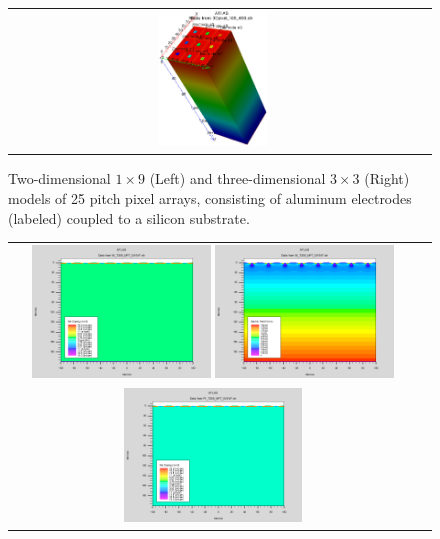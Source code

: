 \begin{refsection}
\begin{figure}[htb]
\begin{center}
\begin{tabular}{cc}
      \includegraphics[width=0.275\textwidth]{fig_FastTiming/Model3D.png}
    \end{tabular}
    \caption{Two-dimensional $1 \times 9$ (Left) and three-dimensional $3 \times 3$ (Right) models of \SI{25}{\micron} pitch pixel arrays, consisting of aluminum electrodes (labeled) coupled to a silicon substrate.
            }
    \label{Materials_Model}
  \end{center}
\end{figure}
\begin{figure}[htb]
  \begin{center}
    \begin{tabular}{cc}
      \includegraphics[width=0.45\textwidth]{fig_FastTiming/Net_Doping_nonn.png}
      \includegraphics[width=0.45\textwidth]{fig_FastTiming/ElectricField_nonn.png} \\
      \includegraphics[width=0.45\textwidth]{fig_FastTiming/Net_Doping_nonp.png}

\end{tabular}
\end{center}
\end{figure}
\end{refsection}
